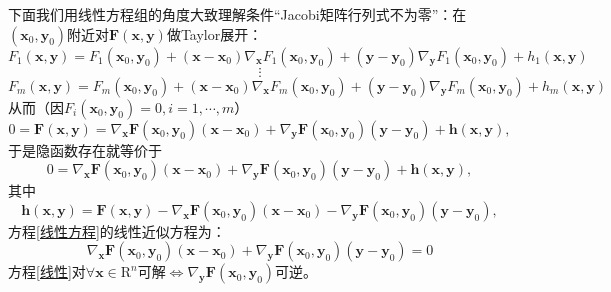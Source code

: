 \documentclass[UTF8]{ctexart}
\begin{document}
        下面我们用线性方程组的角度大致理解条件“Jacobi矩阵行列式不为零”：在$(\boldsymbol{x}_0,\boldsymbol{y}_0)$附近对$\boldsymbol{F}(\boldsymbol{x},\boldsymbol{y})$做Taylor展开：
        $$F_1(\boldsymbol{x},\boldsymbol{y})=F_1(\boldsymbol{x}_0,\boldsymbol{y}_0)+(\boldsymbol{x}-\boldsymbol{x}_0)\nabla_{\boldsymbol{x}}F_1(\boldsymbol{x}_0,\boldsymbol{y}_0)+(\boldsymbol{y}-\boldsymbol{y}_0)\nabla_{\boldsymbol{y}}F_1(\boldsymbol{x}_0,\boldsymbol{y}_0)+h_1(\boldsymbol{x},\boldsymbol{y})$$
        $$\vdots$$
        $$F_m(\boldsymbol{x},\boldsymbol{y})=F_m(\boldsymbol{x}_0,\boldsymbol{y}_0)+(\boldsymbol{x}-\boldsymbol{x}_0)\nabla_{\boldsymbol{x}}F_m(\boldsymbol{x}_0,\boldsymbol{y}_0)+(\boldsymbol{y}-\boldsymbol{y}_0)\nabla_{\boldsymbol{y}}F_m(\boldsymbol{x}_0,\boldsymbol{y}_0)+h_m(\boldsymbol{x},\boldsymbol{y})$$
        从而（因$F_i(\boldsymbol{x}_0,\boldsymbol{y}_0)=0,i=1,\cdots,m$）$$0=\boldsymbol{F(\boldsymbol{x},\boldsymbol{y})}=\nabla_{\boldsymbol{x}}\boldsymbol{F}(\boldsymbol{x}_0,\boldsymbol{y}_0)(\boldsymbol{x}-\boldsymbol{x}_0)+\nabla_{\boldsymbol{y}}\boldsymbol{F}(\boldsymbol{x}_0,\boldsymbol{y}_0)(\boldsymbol{y}-\boldsymbol{y}_0)+\boldsymbol{h}(\boldsymbol{x},\boldsymbol{y}),$$
        于是隐函数存在就等价于
        \begin{equation}
            0=\nabla_{\boldsymbol{x}}\boldsymbol{F}(\boldsymbol{x}_0,\boldsymbol{y}_0)(\boldsymbol{x}-\boldsymbol{x}_0)+\nabla_{\boldsymbol{y}}\boldsymbol{F}(\boldsymbol{x}_0,\boldsymbol{y}_0)(\boldsymbol{y}-\boldsymbol{y}_0)+\boldsymbol{h}(\boldsymbol{x},\boldsymbol{y}),\label{线性方程}
        \end{equation}
        其中
        $$\boldsymbol{h}(\boldsymbol{x},\boldsymbol{y})=\boldsymbol{F(\boldsymbol{x},\boldsymbol{y})}-\nabla_{\boldsymbol{x}}\boldsymbol{F}(\boldsymbol{x}_0,\boldsymbol{y}_0)(\boldsymbol{x}-\boldsymbol{x}_0)-\nabla_{\boldsymbol{y}}\boldsymbol{F}(\boldsymbol{x}_0,\boldsymbol{y}_0)(\boldsymbol{y}-\boldsymbol{y}_0),$$
        方程\eqref{线性方程}的线性近似方程为：
        \begin{equation}
            \nabla_{\boldsymbol{x}}\boldsymbol{F}(\boldsymbol{x}_0,\boldsymbol{y}_0)(\boldsymbol{x}-\boldsymbol{x}_0)+\nabla_{\boldsymbol{y}}\boldsymbol{F}(\boldsymbol{x}_0,\boldsymbol{y}_0)(\boldsymbol{y}-\boldsymbol{y}_0)=0\label{线性}
        \end{equation}
        方程\eqref{线性}对$\forall\boldsymbol{x}\in\mathrm{R}^n$可解$\Leftrightarrow\nabla_{\boldsymbol{y}}\boldsymbol{F}(\boldsymbol{x}_0,\boldsymbol{y}_0)$可逆。
\end{document}
